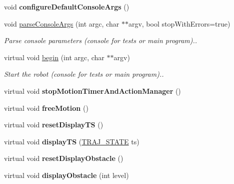 \begin{DoxyCompactItemize}
\mbox{\label{classRobot_a3817e59aa5c6ee337847a04eebd6b0c7}} 
void {\bfseries configure\+Default\+Console\+Args} ()
\item 
\mbox{\label{classRobot_a3a26291a86ba55cd33e173e70bf5ce5d}} 
void \hyperlink{classRobot_a3a26291a86ba55cd33e173e70bf5ce5d}{parse\+Console\+Args} (int argc, char $\ast$$\ast$argv, bool stop\+With\+Errors=true)
\begin{DoxyCompactList}\small\item\em Parse console parameters (console for tests or main program).. \end{DoxyCompactList}\item 
\mbox{\label{classRobot_ae8cede2564e5b9229da095991c064ae4}} 
virtual void \hyperlink{classRobot_ae8cede2564e5b9229da095991c064ae4}{begin} (int argc, char $\ast$$\ast$argv)
\begin{DoxyCompactList}\small\item\em Start the robot (console for tests or main program).. \end{DoxyCompactList}\item 
\mbox{\label{classRobot_a46c797e9dba7c96927fa881851309bf0}} 
virtual void {\bfseries stop\+Motion\+Timer\+And\+Action\+Manager} ()
\item 
\mbox{\label{classRobot_ac7a09e8aad44c834c60d55ed96d25d7f}} 
virtual void {\bfseries free\+Motion} ()
\item 
\mbox{\label{classRobot_a460232bc7b2485ccd6bf3006566da322}} 
virtual void {\bfseries reset\+Display\+TS} ()
\item 
\mbox{\label{classRobot_a7fbd102d7898ba33eecae47cfec530fa}} 
virtual void {\bfseries display\+TS} (\hyperlink{path__manager_8h_adb3360abeb29758da93865c8afcb80eb}{T\+R\+A\+J\+\_\+\+S\+T\+A\+TE} ts)
\item 
\mbox{\label{classRobot_afcfbfb8298b846a516f749c0bd087610}} 
virtual void {\bfseries reset\+Display\+Obstacle} ()
\item 
\mbox{\label{classRobot_a91607f9ec65e768636015e1e9ed71b3f}} 
virtual void {\bfseries display\+Obstacle} (int level)
\end{DoxyCompactItemize}
